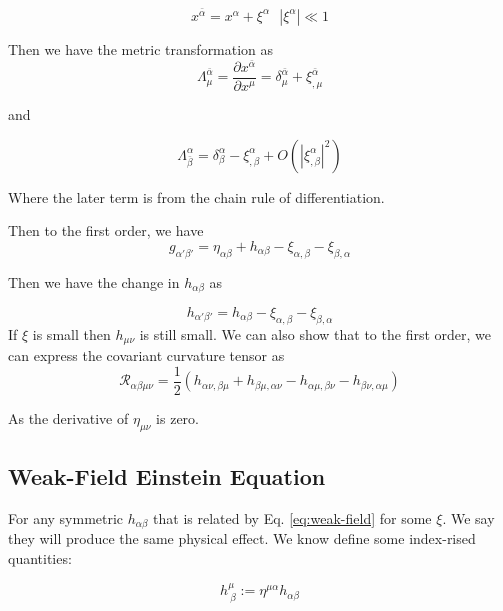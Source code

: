 \documentclass{article}
\newcommand{\Ric}{\mathcal{R}}
\begin{document}
\begin{equation}
    x^{\bar{\alpha}}=x^\alpha+\xi^\alpha ~~~|\xi^\alpha|\ll 1
\end{equation}

Then we have the metric transformation as
\begin{equation}
    \Lambda^{\bar{\alpha}}_\mu=\frac{\partial x^{\bar{\alpha}}}{\partial x^\mu}=\delta^{\bar{\alpha}}_\mu+\xi^{\bar{\alpha}}_{,\mu}
\end{equation}

and

\begin{equation}
    \Lambda^\alpha_{\bar\beta} = \delta^\alpha_\beta - \xi^\alpha_{,\beta} + O(|\xi^\alpha_{,\beta}|^2)
\end{equation}

Where the later term is from the chain rule of differentiation.

Then to the first order, we have 
\begin{equation}
    g_{\alpha'\beta'}=\eta_{\alpha\beta}+h_{\alpha\beta}-\xi_{\alpha,\beta}-\xi_{\beta,\alpha}
\end{equation}

Then we have the change in $h_{\alpha\beta}$ as

\begin{equation}
    \boxed{h_{\alpha'\beta'}=h_{\alpha\beta}-\xi_{\alpha,\beta}-\xi_{\beta,\alpha}}
\end{equation}
If $\xi$ is small then $h_{\mu\nu}$ is still small. We can also show that to the first order, we can express the covariant curvature tensor as 
\begin{equation}
    \boxed{\Ric_{\alpha\beta\mu\nu}=\frac{1}{2}(h_{\alpha\nu,\beta\mu}+h_{\beta\mu,\alpha\nu}-h_{\alpha\mu,\beta\nu}-h_{\beta\nu,\alpha\mu})}
\end{equation}

As the derivative of $\eta_{\mu\nu}$ is zero.

\subsection{Weak-Field Einstein Equation}

For any symmetric $h_{\alpha\beta}$ that is related by Eq. \ref{eq:weak-field} for some $\xi$. We say they will produce the same physical effect. We know define some index-rised quantities:

\begin{equation}
    h^\mu_{~\beta}:=\eta^{\mu\alpha}h_{\alpha\beta}
\end{equation}
\end{document}
